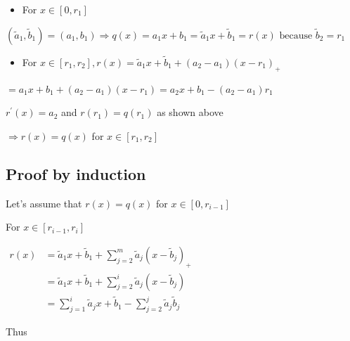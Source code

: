 
\begin{itemize}
  \item For $x \in\left[0, r_{1}\right]$
\end{itemize}

$
\left(\tilde{a}_{1}, \tilde{b}_{1}\right)=\left(a_{1}, b_{1}\right) \Longrightarrow q(x)=a_{1} x+b_{1}=\tilde{a}_{1} x+\tilde{b}_{1}=r(x) \text { because } \tilde{b}_{2}=r_{1}
$

\begin{itemize}
  \item For $x \in\left[r_{1}, r_{2}\right], r(x)=\tilde{a}_{1} x+\tilde{b}_{1}+\left(a_{2}-a_{1}\right)\left(x-r_{1}\right)_{+}$
\end{itemize}

$
=a_{1} x+b_{1}+\left(a_{2}-a_{1}\right)\left(x-r_{1}\right)=a_{2} x+b_{1}-\left(a_{2}-a_{1}\right) r_{1}
$

$r^{\prime}(x)=a_{2}$ and $r\left(r_{1}\right)=q\left(r_{1}\right)$ as shown above

$\Longrightarrow r(x)=q(x)$ for $x \in\left[r_{1}, r_{2}\right]$

\subsection*{Proof by induction}
Let's assume that $r(x)=q(x)$ for $x \in\left[0, r_{i-1}\right]$

For $x \in\left[r_{i-1}, r_{i}\right]$

$
\begin{aligned}
r(x) & =\tilde{a}_{1} x+\tilde{b}_{1}+\sum_{j=2}^{m} \tilde{a}_{j}\left(x-\tilde{b}_{j}\right)_{+} \\
& =\tilde{a}_{1} x+\tilde{b}_{1}+\sum_{j=2}^{i} \tilde{a}_{j}\left(x-\tilde{b}_{j}\right) \\
& =\sum_{j=1}^{i} \tilde{a}_{j} x+\tilde{b}_{1}-\sum_{j=2}^{j} \tilde{a}_{j} \tilde{b}_{j}
\end{aligned}
$

Thus

